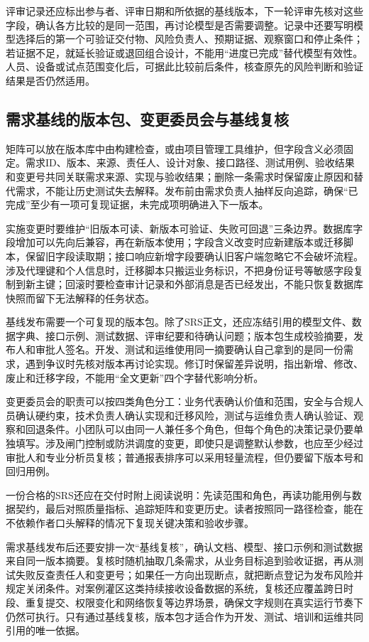 评审记录还应标出参与者、评审日期和所依据的基线版本，下一轮评审先核对这些字段，确认各方比较的是同一范围，再讨论模型是否需要调整。记录中还要写明模型选择后的第一个可验证交付物、风险负责人、预期证据、观察窗口和停止条件；若证据不足，就延长验证或退回组合设计，不能用“进度已完成”替代模型有效性。人员、设备或试点范围变化后，可据此比较前后条件，核查原先的风险判断和验证结果是否仍然适用。

\subsection{需求基线的版本包、变更委员会与基线复核}

矩阵可以放在版本库中由构建检查，或由项目管理工具维护，但字段含义必须固定。需求ID、版本、来源、责任人、设计对象、接口路径、测试用例、验收结果和变更号共同关联需求来源、实现与验收结果；删除一条需求时保留废止原因和替代需求，不能让历史测试失去解释。发布前由需求负责人抽样反向追踪，确保“已完成”至少有一项可复现证据，未完成项明确进入下一版本。

实施变更时要维护“旧版本可读、新版本可验证、失败可回退”三条边界。数据库字段增加可以先向后兼容，再在新版本使用；字段含义改变时应新建版本或迁移脚本，保留旧字段读取期；接口响应新增字段要确认旧客户端忽略它不会破坏流程。涉及代理键和个人信息时，迁移脚本只搬运业务标识，不把身份证号等敏感字段复制到新主键；回滚时要检查审计记录和外部消息是否已经发出，不能只恢复数据库快照而留下无法解释的任务状态。

基线发布需要一个可复现的版本包。除了SRS正文，还应冻结引用的模型文件、数据字典、接口示例、测试数据、评审纪要和待确认问题；版本包生成校验摘要，发布人和审批人签名。开发、测试和运维使用同一摘要确认自己拿到的是同一份需求，遇到争议时先核对版本再讨论实现。修订时保留差异说明，指出新增、修改、废止和迁移字段，不能用“全文更新”四个字替代影响分析。

变更委员会的职责可以按四类角色分工：业务代表确认价值和范围，安全与合规人员确认硬约束，技术负责人确认实现和迁移风险，测试与运维负责人确认验证、观察和回退条件。小团队可以由同一人兼任多个角色，但每个角色的决策记录仍要单独填写。涉及闸门控制或防洪调度的变更，即使只是调整默认参数，也应至少经过审批人和专业分析员复核；普通报表排序可以采用轻量流程，但仍要留下版本号和回归用例。

一份合格的SRS还应在交付时附上阅读说明：先读范围和角色，再读功能用例与数据契约，最后对照质量指标、追踪矩阵和变更历史。读者按照同一路径检查，能在不依赖作者口头解释的情况下复现关键决策和验收步骤。

需求基线发布后还要安排一次“基线复核”，确认文档、模型、接口示例和测试数据来自同一版本摘要。复核时随机抽取几条需求，从业务目标追到验收证据，再从测试失败反查责任人和变更号；如果任一方向出现断点，就把断点登记为发布风险并规定关闭条件。对案例灌区这类持续接收设备数据的系统，复核还应覆盖跨日时段、重复提交、权限变化和网络恢复等边界场景，确保文字规则在真实运行节奏下仍然可执行。只有通过基线复核，版本包才适合作为开发、测试、培训和运维共同引用的唯一依据。

